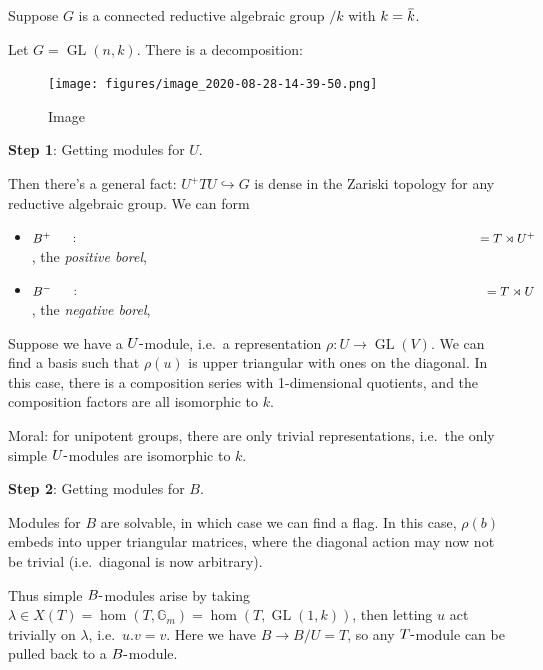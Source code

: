 Suppose \(G\) is a connected reductive algebraic group \(/k\) with
\(k = \mkern 1.5mu\overline{\mkern-1.5muk\mkern-1.5mu}\mkern 1.5mu\).

\begin{example}

\begin{example}

Let \(G = \operatorname{GL}(n, k)\). There is a decomposition:

\begin{figure}
\centering
\texttt{[image: figures/image\_2020-08-28-14-39-50.png]}
\caption{Image}
\end{figure}

\end{example}

\end{example}

\textbf{Step 1}: Getting modules for \(U\).

Then there's a general fact: \(U^+ T U \hookrightarrow G\) is dense in
the Zariski topology for any reductive algebraic group. We can form

\begin{itemize}
\tightlist
\item
  \(B^+ \mathrel{\vcenter{:}}= T\rtimes U^+\), the \emph{positive
  borel},
\item
  \(B^- \mathrel{\vcenter{:}}= T\rtimes U\), the \emph{negative borel},
\end{itemize}

Suppose we have a \(U{\hbox{-}}\)module, i.e.~a representation
\(\rho: U \to \operatorname{GL}(V)\). We can find a basis such that
\(\rho(u)\) is upper triangular with ones on the diagonal. In this case,
there is a composition series with 1-dimensional quotients, and the
composition factors are all isomorphic to \(k\).

Moral: for unipotent groups, there are only trivial representations,
i.e.~the only simple \(U{\hbox{-}}\)modules are isomorphic to \(k\).

\textbf{Step 2}: Getting modules for \(B\).

Modules for \(B\) are solvable, in which case we can find a flag. In
this case, \(\rho(b)\) embeds into upper triangular matrices, where the
diagonal action may now not be trivial (i.e.~diagonal is now arbitrary).

Thus simple \(B{\hbox{-}}\)modules arise by taking
\(\lambda \in X(T) = \hom(T, {\mathbb{G}}_m) = \hom(T, \operatorname{GL}(1, k))\),
then letting \(u\) act trivially on \(\lambda\), i.e.~\(u.v = v\). Here
we have \(B \to B/U = T\), so any \(T{\hbox{-}}\)module can be pulled
back to a \(B{\hbox{-}}\)module.

